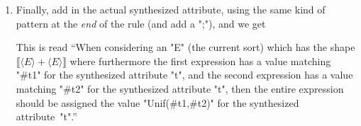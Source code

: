 \documentclass[11pt]{article} %
\begin{document}
\begin{enumerate}
\item Finally, add in the actual synthesized attribute, using the same kind of pattern at the
  \emph{end} of the rule (and add a ";"), and we get
  This is read ``When considering an "E" (the current sort) which has the shape
  $⟦⟨E⟩+⟨E⟩⟧$ where furthermore the first expression has a value matching "#t1" for the
  synthesized attribute "t", and the second expression has a value matching "#t2" for the
  synthesized attribute "t", then the entire expression should be assigned the value "Unif(#t1,#t2)"
  for the synthesized attribute~"t".''

\end{enumerate}
\end{document}
